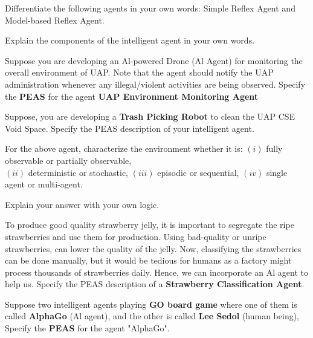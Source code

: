 \begin{Question}[4][S-21]
   Differentiate the following agents in your own words: Simple Reflex Agent and Model-based Reflex Agent.

   Explain the components of the intelligent agent in your own words.
\end{Question}

\vspace{1em}
\begin{Question}[4][CO1 \rgbGray{/} S-24]
   Suppose you are developing an Al-powered Drone (Al Agent) for monitoring the overall environment of UAP. Note that the agent should notify the UAP administration whenever any illegal/violent activities are being observed. Specify the \textbf{PEAS} for the agent \textbf{UAP Environment Monitoring Agent}
\end{Question}

\vspace{1em}
\begin{Question}[4][F-22 \rgbGray{/} S-21]
   Suppose, you are developing a \textbf{Trash Picking Robot} to clean the UAP CSE Void Space. Specify the PEAS description of your intelligent agent.
\end{Question}
\begin{Question}[4]
   For the above agent, characterize the environment whether it is:
   $(i)$ fully observable or partially observable, \\
   $(ii)$ deterministic or stochastic,
   $(iii)$ episodic or sequential,
   $(iv)$ single agent or multi-agent.
   
   Explain your answer with your own logic.
\end{Question}

\vspace{1em}
\begin{Question}[4][F-23]
   To produce good quality strawberry jelly, it is important to segregate the ripe strawberries and use them for production. Using bad-quality or unripe strawberries, can lower the quality of the jelly. Now, classifying the strawberries can be done manually, but it would be tedious for humans as a factory might process thousands of strawberries daily. Hence, we can incorporate an Al agent to help us. Specify the PEAS description of a \textbf{Strawberry Classification Agent}.
\end{Question}

\vspace{1em}
\begin{Question}[4][CO1 \rgbGray{/} S-23]
   Suppose two intelligent agents playing \textbf{GO board game} where one of them is called \textbf{AlphaGo} (Al agent), and the other is called \textbf{Lee Sedol} (human being), Specify the \textbf{PEAS} for the agent "AlphaGo".
\end{Question}


